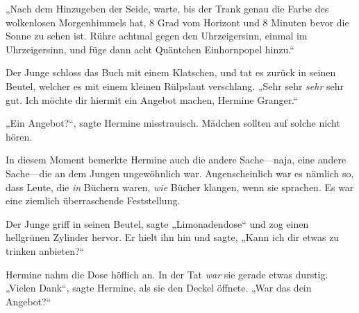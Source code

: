 „Nach dem Hinzugeben der Seide, warte, bis der Trank genau die Farbe des wolkenlosen Morgenhimmels hat, 8 Grad vom Horizont und 8 Minuten bevor die Sonne zu sehen ist. Rühre achtmal gegen den Uhrzeigersinn, einmal im Uhrzeigersinn, und füge dann acht Quäntchen Einhornpopel hinzu.“

Der Junge schloss das Buch mit einem Klatschen, und tat es zurück in seinen Beutel, welcher es mit einem kleinen Rülpslaut verschlang. „Sehr sehr \emph{sehr} sehr gut. Ich möchte dir hiermit ein Angebot machen, Hermine Granger.“

„Ein Angebot?“, sagte Hermine misstrauisch. Mädchen sollten auf solche nicht hören.

In diesem Moment bemerkte Hermine auch die andere Sache—naja, eine andere Sache—die an dem Jungen ungewöhnlich war. Augenscheinlich war es nämlich so, dass Leute, die \emph{in} Büchern waren, \emph{wie} Bücher klangen, wenn sie sprachen. Es war eine ziemlich überraschende Feststellung.

Der Junge griff in seinen Beutel, sagte „Limonadendose“ und zog einen hellgrünen Zylinder hervor. Er hielt ihn hin und sagte, „Kann ich dir etwas zu trinken anbieten?“

Hermine nahm die Dose höflich an. In der Tat \emph{war} sie gerade etwas durstig. „Vielen Dank“, sagte Hermine, als sie den Deckel öffnete. „War das dein Angebot?“

